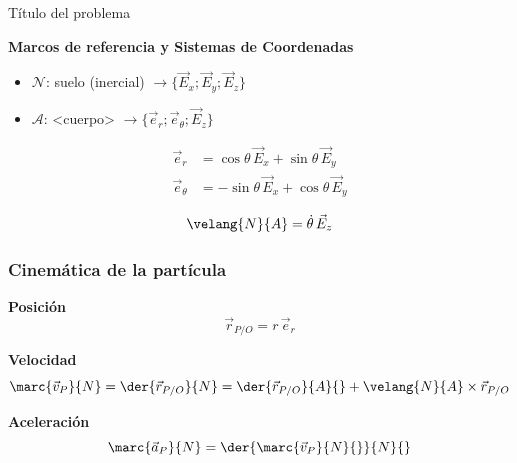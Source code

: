 \begin{solucion}{Título del problema}

\textbf{Marcos de referencia y Sistemas de Coordenadas}
\begin{itemize}
    \item $\mathcal{N}$: suelo (inercial) $\longrightarrow \{\vec{E}_x;\vec{E}_y;\vec{E}_z\}$
    \item $\mathcal{A}$: <cuerpo> $\longrightarrow \{\vec{e}_r;\vec{e}_\theta;\vec{E}_z\}$
\end{itemize}


\begin{equation*}
\begin{split}
    \vec{e}_r &= \cos\theta\,\vec{E}_x + \sin\theta\,\vec{E}_y\\
    \vec{e}_\theta &= -\sin\theta\,\vec{E}_x + \cos\theta\,\vec{E}_y
\end{split}
\end{equation*}

$$\velang{N}{A} = \dot\theta\,\vec{E}_z$$

\subsubsection*{Cinemática de la partícula}
\textbf{Posición}\\
$$\vec{r}_{P/O} = r\,\vec{e}_r$$

\textbf{Velocidad}\\
$$\marc{\vec{v}_P}{N} = \der{\vec{r}_{P/O}}{N} = \der{\vec{r}_{P/O}}{A}{} + \velang{N}{A}\times\vec{r}_{P/O}$$

\textbf{Aceleración}\\
$$\marc{\vec{a}_P}{N} = \der{\marc{\vec{v}_P}{N}{}}{N}{}$$




\end{solucion}
